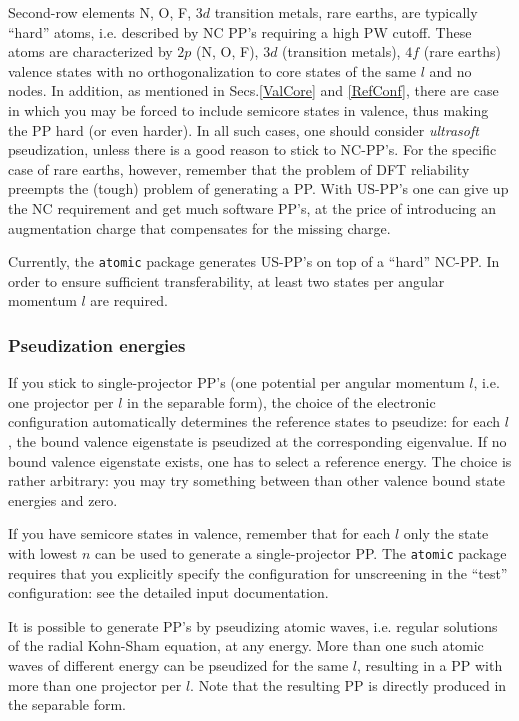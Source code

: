 \documentclass[12pt,a4paper]{article}
\begin{document}
Second-row elements N, O, F, $3d$ transition metals, rare earths, 
are typically ``hard'' atoms, i.e. described by NC PP's requiring
a high PW cutoff. These atoms are characterized by $2p$ (N, O, F), 
$3d$ (transition metals), $4f$ (rare earths) valence states with no 
orthogonalization to core states of the same $l$ and no nodes.
In addition, as mentioned in Secs.\ref{ValCore} and \ref{RefConf}, 
there are case in which you may be forced to include semicore states
in valence, thus making the PP hard (or even harder).  
In all such cases, one should consider 
{\em ultrasoft} pseudization, unless there is a good reason to stick
to NC-PP's. For the specific case of rare earths, however, remember 
that the problem of DFT reliability preempts the (tough) problem of 
generating a PP. With US-PP's one can give up the NC requirement
and get much software PP's, at the price of introducing an augmentation 
charge that compensates for the missing charge. 

Currently, the \texttt{atomic} package generates US-PP's on top of
a ``hard'' NC-PP. In order to ensure sufficient transferability, 
at least two states per angular momentum $l$ are required. 

\subsubsection{Pseudization energies}
\label{pseudiz}
If you stick to single-projector PP's (one potential per angular momentum 
$l$, i.e. one projector per $l$ in the separable form), the choice of the 
electronic configuration automatically determines the reference states
to pseudize: for each $l$, the bound valence eigenstate is pseudized
at the corresponding eigenvalue. If no bound valence eigenstate exists,
one has to select a reference energy. The choice is rather arbitrary:
you may try something between than other valence bound state energies
and zero. 

If you have semicore states in valence, remember that for each $l$
only the state with lowest $n$ can be used to generate a single-projector
PP. The \texttt{atomic} package requires that you explicitly specify the 
configuration for unscreening in the ``test'' configuration:
see the detailed input documentation.

It is possible to generate PP's by pseudizing atomic waves,
i.e. regular solutions of the radial Kohn-Sham equation, at any
energy. More than one such atomic waves of different energy can be
pseudized for the same $l$, resulting in a PP with more than one 
projector per $l$. Note that the resulting PP is directly produced
in the separable form. 
\end{document}
